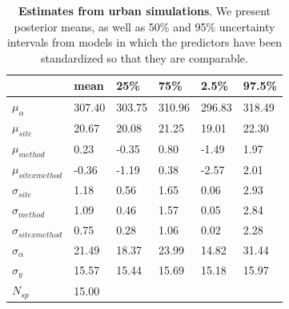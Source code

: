 \documentclass{article}\usepackage[]{graphicx}\usepackage[]{color}
\begin{document}
\begin{table}[ht]
\centering
\caption{\textbf{Estimates from urban simulations}. We present posterior means, as well as 50\% and 95\% uncertainty intervals from models in which the predictors have been standardized so that they are comparable.} 
\label{tab:urban}
\begingroup\footnotesize
\begin{tabular}{|p{}|p{}p{}p{}p{}p{}|}
  \hline
 & mean & 25\% & 75\% & 2.5\% & 97.5\% \\ 
  \hline
$\mu_{\alpha}$ & 307.40 & 303.75 & 310.96 & 296.83 & 318.49 \\ 
  $\mu_{site}$ & 20.67 & 20.08 & 21.25 & 19.01 & 22.30 \\ 
  $\mu_{method}$ & 0.23 & -0.35 & 0.80 & -1.49 & 1.97 \\ 
  $\mu_{sitexmethod}$ & -0.36 & -1.19 & 0.38 & -2.57 & 2.01 \\ 
  $\sigma_{site}$ & 1.18 & 0.56 & 1.65 & 0.06 & 2.93 \\ 
  $\sigma_{method}$ & 1.09 & 0.46 & 1.57 & 0.05 & 2.84 \\ 
  $\sigma_{sitexmethod}$ & 0.75 & 0.28 & 1.06 & 0.02 & 2.28 \\ 
  $\sigma_{\alpha}$ & 21.49 & 18.37 & 23.99 & 14.82 & 31.44 \\ 
  $\sigma_{y}$ & 15.57 & 15.44 & 15.69 & 15.18 & 15.97 \\ 
   \hline
$N_{sp}$ & 15.00 &  &  &  &  \\ 
   \hline
\end{tabular}
\endgroup
\end{table}
\end{document}
